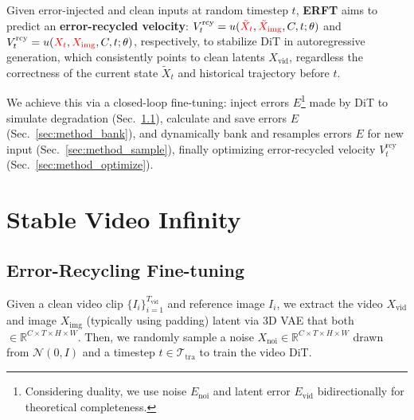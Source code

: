 \documentclass{article} %
\newcommand\vid{\mathrm{vid}}
\newcommand\rcy{\mathrm{rcy}}
\newcommand\noi{\mathrm{noi}}
\newcommand\img{\mathrm{img}}
\newcommand{\err}{E}
\newcommand{\method}{Stable Video Infinity }
\begin{document}
\begin{tcolorbox}
Given error-injected and clean inputs at random timestep $t$, \textbf{ERFT} aims to predict an \textbf{error-recycled velocity}: $V^\rcy_t=u({\color{red}{\tilde{X}_t}}, {\color{red}{\tilde{X}_\img}}, C, t; \theta)$ and $V^\rcy_t= u({\color{red}{X_t}}, {\color{red}{X_\img}}, C, t; \theta)$, respectively, to stabilize DiT in autoregressive generation, which consistently points to clean latents $X_\vid$, regardless the correctness of the current state $\tilde{X}_t$ and historical trajectory before $t$.
\end{tcolorbox}

We achieve this via a closed-loop fine-tuning: inject errors $\err$\footnote{Considering duality, we use noise $E_\noi$ and latent error $E_\vid$ bidirectionally for theoretical completeness.} made by DiT to simulate degradation (Sec.~\ref{sec:method_dit}), calculate and save errors $\err$ (Sec.~\ref{sec:method_bank}), and dynamically bank and resamples errors $\err$ for new input (Sec.~\ref{sec:method_sample}), finally optimizing error-recycled velocity $V^\rcy_t$ (Sec.~\ref{sec:method_optimize}).

\section{\method\label{sec:method}}

\subsection{Error-Recycling Fine-tuning}\label{sec:method_dit}

Given a clean video clip $\{I_i\}_{i=1}^{T_\vid}$ and reference image $I_i$, we extract the video $X_\vid$ and image $X_\img$ (typically using padding) latent via 3D VAE that both $\in \mathbb{R}^{C\times T\times H\times W}$. Then, we randomly sample a noise $X_\noi\in \mathbb{R}^{C\times T\times H\times W}$ drawn from $\mathcal{N}(0, I)$ and a timestep $t\in\mathcal{T}_{\mathrm{tra}}$ to train the video DiT.
\end{document}
